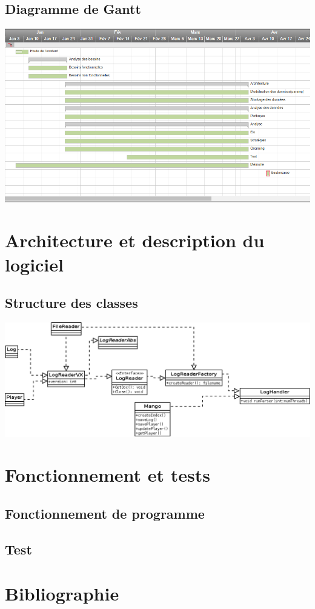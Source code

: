\documentclass{scrreprt}
\begin{document}
\section{Diagramme de Gantt}

\includegraphics[scale=0.45,keepaspectratio]{gantt}\\

\chapter{Architecture et description du logiciel}

\section{Structure des classes}


\includegraphics[scale=0.45,keepaspectratio]{diaRessources/nouvelleArch}\\


\chapter{Fonctionnement et tests}
\section{Fonctionnement de programme}
\section{Test}
\chapter{Bibliographie}

\end{document}
